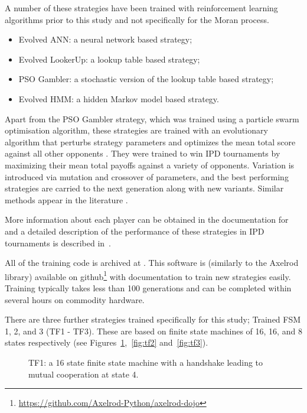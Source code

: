 \documentclass[10pt,journal]{IEEEtran}
\begin{document}
A number of these strategies have been trained with reinforcement learning
algorithms prior to this study and not specifically for the Moran process.

\begin{itemize}
    \item Evolved ANN: a neural network based strategy;
    \item Evolved LookerUp: a lookup table based strategy;
    \item PSO Gambler: a stochastic version of the lookup table based strategy;
    \item Evolved HMM: a hidden Markov model based strategy.
\end{itemize}

Apart from the PSO Gambler strategy, which was trained using a particle swarm
optimisation algorithm, these strategies are trained with an evolutionary
algorithm that perturbs strategy parameters and optimizes the mean total score
against all other opponents \cite{affenzeller2009genetic}. They were trained to
win IPD tournaments by maximizing their mean total payoffs against a variety
of opponents. Variation is
introduced via mutation and crossover of parameters, and the best performing
strategies are carried to the next generation along with new variants. Similar
methods appear in the literature \cite{Ashlock2006}.

More information about each player can be obtained in the documentation for
\cite{axelrodproject} and a detailed description of the performance
of these strategies in IPD tournaments is described in~\cite{Harper2017}.

All of the training code is archived at \cite{marc_harper_2017_824264}. This
software is (similarly to the Axelrod library) available on 
github\footnote{\url{https://github.com/Axelrod-Python/axelrod-dojo}} 
with documentation to
train new strategies easily. Training
typically takes less than 100 generations and can be completed within several
hours on commodity hardware.

There are three further strategies trained specifically for this study; Trained
FSM 1, 2, and 3 (TF1 - TF3). These are based on finite state machines of 16, 16,
and 8 states respectively (see Figures~\ref{fig:tf1},~\ref{fig:tf2}
and~\ref{fig:tf3}).


\begin{figure}[!hbtp]
    \centering
    \scalebox{.5}{}
    \caption{TF1: a 16 state finite state machine with a handshake leading to
    mutual cooperation at state 4.}
    \label{fig:tf1}
\end{figure}
\end{document}
